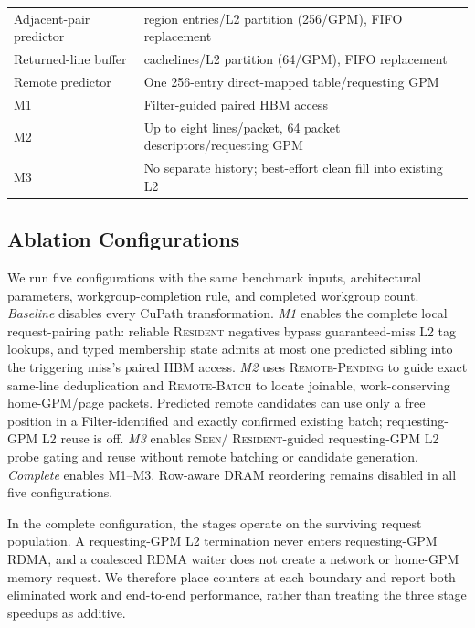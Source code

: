 \begin{table}[t]
\begin{tabularx}{\columnwidth}{@{}l>{\raggedright\arraybackslash}X@{}}
    Adjacent-pair predictor & 64 region entries/L2 partition (256/GPM),
                              FIFO replacement \\
    Returned-line buffer & 16 cachelines/L2 partition (64/GPM), FIFO replacement \\
    Remote predictor & One 256-entry direct-mapped table/requesting GPM \\
    M1 & Filter-guided paired HBM access \\
    M2 & Up to eight lines/packet, 64 packet descriptors/requesting GPM \\
    M3 & No separate history; best-effort clean fill into existing L2 \\
    \bottomrule
  \end{tabularx}
\end{table}

\subsection{Ablation Configurations}

We run five configurations with the same benchmark inputs, architectural
parameters, workgroup-completion rule, and completed workgroup count.
\emph{Baseline} disables every CuPath transformation.  \emph{M1} enables the
complete local request-pairing path: reliable \textsc{Resident} negatives
bypass guaranteed-miss L2 tag lookups, and typed membership state admits at
most one predicted sibling into the triggering miss's paired HBM access.
\emph{M2} uses \textsc{Remote-Pending} to guide exact same-line
deduplication and \textsc{Remote-Batch} to locate joinable, work-conserving
home-GPM/page packets. Predicted remote candidates can use only a free position
in a Filter-identified and exactly confirmed existing batch;
requesting-GPM L2 reuse is off.  \emph{M3} enables \textsc{Seen}/
\textsc{Resident}-guided requesting-GPM L2 probe gating and reuse without remote
batching or candidate generation.  \emph{Complete} enables M1--M3.  Row-aware DRAM
reordering remains disabled in all five configurations.

In the complete configuration, the stages operate on the surviving request
population.  A requesting-GPM L2 termination never enters requesting-GPM RDMA, and a
coalesced RDMA waiter does not create a network or home-GPM memory request.  We therefore place
counters at each boundary and report both eliminated work and end-to-end
performance, rather than treating the three stage speedups as additive.

